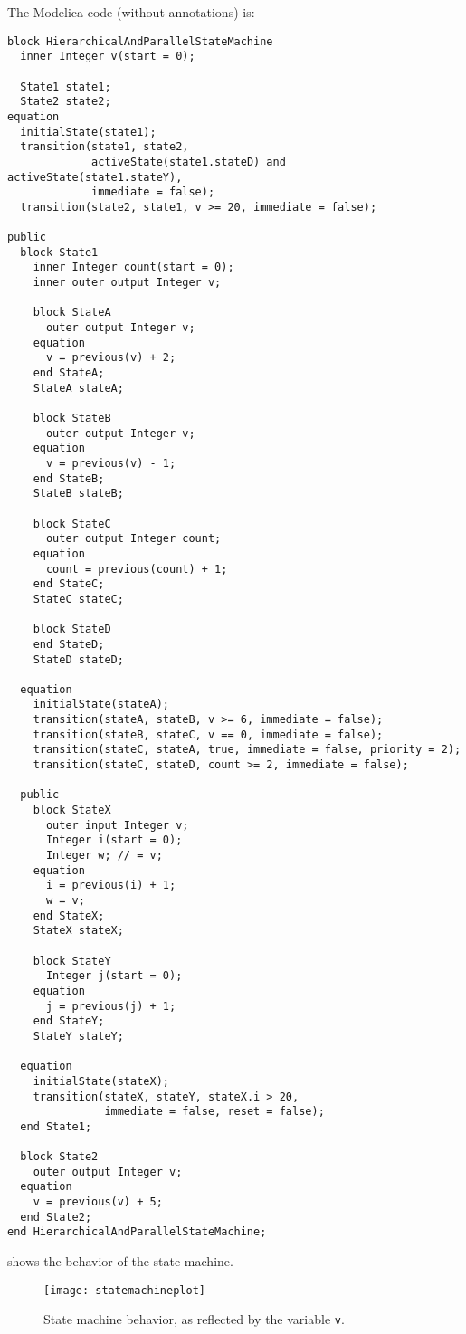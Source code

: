 \begin{example}
The Modelica code (without annotations) is:
\begin{lstlisting}[language=modelica]
block HierarchicalAndParallelStateMachine
  inner Integer v(start = 0);

  State1 state1;
  State2 state2;
equation
  initialState(state1);
  transition(state1, state2,
             activeState(state1.stateD) and activeState(state1.stateY),
             immediate = false);
  transition(state2, state1, v >= 20, immediate = false);

public
  block State1
    inner Integer count(start = 0);
    inner outer output Integer v;

    block StateA
      outer output Integer v;
    equation
      v = previous(v) + 2;
    end StateA;
    StateA stateA;

    block StateB
      outer output Integer v;
    equation
      v = previous(v) - 1;
    end StateB;
    StateB stateB;

    block StateC
      outer output Integer count;
    equation
      count = previous(count) + 1;
    end StateC;
    StateC stateC;

    block StateD
    end StateD;
    StateD stateD;

  equation
    initialState(stateA);
    transition(stateA, stateB, v >= 6, immediate = false);
    transition(stateB, stateC, v == 0, immediate = false);
    transition(stateC, stateA, true, immediate = false, priority = 2);
    transition(stateC, stateD, count >= 2, immediate = false);

  public
    block StateX
      outer input Integer v;
      Integer i(start = 0);
      Integer w; // = v;
    equation
      i = previous(i) + 1;
      w = v;
    end StateX;
    StateX stateX;

    block StateY
      Integer j(start = 0);
    equation
      j = previous(j) + 1;
    end StateY;
    StateY stateY;

  equation
    initialState(stateX);
    transition(stateX, stateY, stateX.i > 20,
               immediate = false, reset = false);
  end State1;

  block State2
    outer output Integer v;
  equation
    v = previous(v) + 5;
  end State2;
end HierarchicalAndParallelStateMachine;
\end{lstlisting}

 shows the behavior of the state machine.
\begin{figure}[H]
  \begin{center}
    \texttt{[image: statemachineplot]}
  \end{center}
  \caption{State machine behavior, as reflected by the variable \lstinline!v!.}
  \label{fig:state-machine-behavior}
\end{figure}


\end{example}
